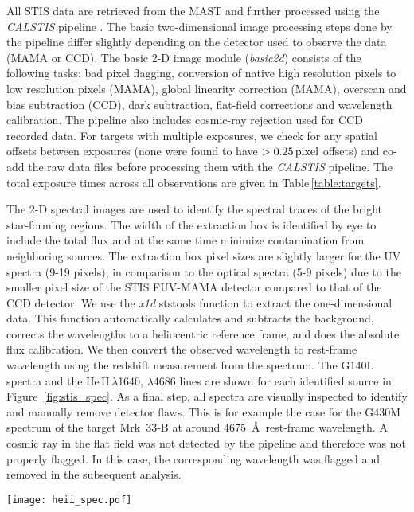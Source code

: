 \documentclass[]{aastex63}
\begin{document}
All STIS data are retrieved from the MAST and further processed using the {\it CALSTIS} pipeline \citep[see][]{sohn_stis_2019}. 
The basic two-dimensional image processing steps done by the pipeline differ slightly depending on the detector used to observe the data (MAMA or CCD). The basic 2-D image module (\textit{basic2d}) consists of the following tasks: bad pixel flagging, conversion of native high resolution pixels to low resolution pixels (MAMA), global linearity correction (MAMA), overscan and bias subtraction (CCD), dark subtraction, flat-field corrections and wavelength calibration. 
The pipeline also includes cosmic-ray rejection used for CCD recorded data. 
For targets with multiple exposures, we check for any spatial offsets between exposures (none were found to have $>0.25\,{\rm pixel}$ offsets) and co-add the raw data files before processing them with the {\it CALSTIS} pipeline.
The total exposure times across all observations are given in Table\,\ref{table:targets}. 

The 2-D spectral images are used to identify the spectral traces of the bright star-forming regions. The width of the extraction box is identified by eye to include the total flux and at the same time minimize contamination from neighboring sources. The extraction box pixel sizes are slightly larger for the UV spectra (9-19 pixels), in comparison to the optical spectra (5-9 pixels) due to the smaller pixel size of the STIS FUV-MAMA detector compared to that of the CCD detector. 
We use the {\it x1d} ststools function to extract the one-dimensional data. This function automatically calculates and subtracts the background, corrects the wavelengths to a heliocentric reference frame, and does the absolute flux calibration. We then convert the observed wavelength to rest-frame wavelength using the redshift measurement from the spectrum. 
The G140L spectra and the He\,II\,$\lambda$1640, $\lambda$4686 lines are shown for each identified source in Figure~\ref{fig:stis_spec}.
As a final step, all spectra are visually inspected to identify and manually remove detector flaws. This is for example the case for the G430M spectrum of the target Mrk~33-B at around 4675~\AA\ rest-frame wavelength. A cosmic ray in the flat field was not detected by the pipeline and therefore was not properly flagged. In this case, the corresponding wavelength was flagged and removed in the subsequent analysis.
%
\begin{figure*}[h!]
    \centering
    \texttt{[image: heii\_spec.pdf]}
    \caption{Extracted STIS spectra for the G140L grating and the He\,II\,$\lambda$4686 line in the G430M grating. For each galaxy, we display the spectra of all identified He~II emitters. For multiple spectra we add an offset to distinguish them. We show the continuum fit with blue dashed lines. The data points used for the continuum fit for the G140L grating are marked in red. The wavelength windows for the He\,II\,$\lambda$1640 and $\lambda$4686 lines are marked with a gray background and the lines are highlighted in turquoise. The measured quantities for each spectrum are displayed on the top and also summarized in Table\,\ref{table:ebv}.} 
    \label{fig:stis_spec}
\end{figure*}
%
\end{document}
